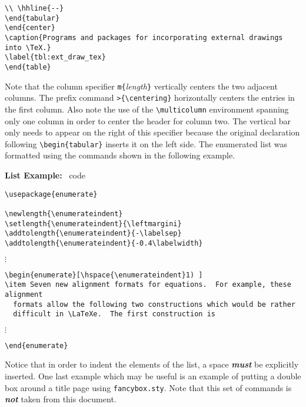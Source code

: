 \documentclass[11pt,titlepage]{article}
\newlength{\enumerateindent}
\begin{document}
%
\begin{verbatim}
\\ \hhline{--} 
\end{tabular}
\end{center}
\caption{Programs and packages for incorporating external drawings into \TeX.}
\label{tbl:ext_draw_tex}
\end{table}
\end{verbatim}
%
Note that the column specifier \verb+m{+\textit{length}\verb+}+ vertically
centers the two adjacent columns.  The prefix command \verb+>{\centering}+
horizontally centers the entries in the first column.  Also note the use of
the \verb+\multicolumn+ environment spanning only one column in order to
center the header for column two.  The vertical bar only needs to appear on
the right of this specifier because the original declaration following
\verb+\begin{tabular}+ inserts it on the left side.  The enumerated list was
formatted using the commands shown in the following example.

\noindent\textbf{List Example:} \LaTeXe\ code
%
\vspace{-\parskip}
\begin{verbatim}
\usepackage{enumerate}

\newlength{\enumerateindent}
\setlength{\enumerateindent}{\leftmargini}
\addtolength{\enumerateindent}{-\labelsep}
\addtolength{\enumerateindent}{-0.4\labelwidth}
\end{verbatim}
%
\vspace{-1.25\parskip}
\hspace{1em}$\vdots$
\vspace{-1.25\parskip}
%
\begin{verbatim}
\begin{enumerate}[\hspace{\enumerateindent}1) ]
\item Seven new alignment formats for equations.  For example, these alignment
  formats allow the following two constructions which would be rather
  difficult in \LaTeXe.  The first construction is
\end{verbatim}
%
\vspace{-1.25\parskip}
\hspace{1em}$\vdots$
\vspace{-1.25\parskip}
%
\begin{verbatim}
\end{enumerate}
\end{verbatim}
%
Notice that in order to indent the elements of the list, a space
\textbf{\textit{must}} be explicitly inserted.  One last example which may be
useful is an example of putting a double box around a title page using
\texttt{fancybox.sty}.  Note that this set of commands is
\textbf{\textit{not}} taken from this document.
\end{document}
